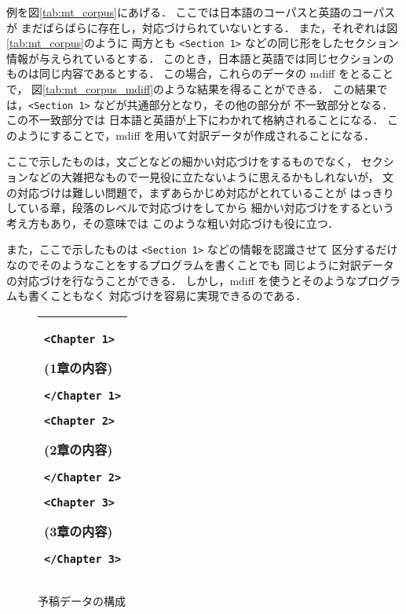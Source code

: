 例を図\ref{tab:mt_corpus}にあげる．
ここでは日本語のコーパスと英語のコーパスが
まだばらばらに存在し，対応づけられていないとする．
また，それぞれは図\ref{tab:mt_corpus}のように
両方とも \verb+<Section 1>+ などの同じ形をしたセクション情報が与えられているとする．
このとき，日本語と英語では同じセクションのものは同じ内容であるとする．
この場合，これらのデータの mdiff をとることで，
図\ref{tab:mt_corpus_mdiff}のような結果を得ることができる．
この結果では，\verb+<Section 1>+ などが共通部分となり，その他の部分が
不一致部分となる．この不一致部分では
日本語と英語が上下にわかれて格納されることになる．
このようにすることで，mdiff を用いて対訳データが作成されることになる．

ここで示したものは，文ごとなどの細かい対応づけをするものでなく，
セクションなどの大雑把なもので一見役に立たないように思えるかもしれないが，
文の対応づけは難しい問題で，まずあらかじめ対応がとれていることが
はっきりしている章，段落のレベルで対応づけをしてから
細かい対応づけをするという考え方もあり\cite{haruno_ipsj97}，その意味では
このような粗い対応づけも役に立つ．

また，ここで示したものは \verb+<Section 1>+ などの情報を認識させて
区分するだけなのでそのようなことをするプログラムを書くことでも
同じように対訳データの対応づけを行なうことができる．
しかし，mdiff を使うとそのようなプログラムも書くこともなく
対応づけを容易に実現できるのである．

\begin{figure}[t]
  \begin{center}
    \leavevmode

    \begin{tabular}[h]{|l|}\hline
{\begin{minipage}[h]{4cm}
\verb+<Chapter 1>+

(1章の内容)

\verb+</Chapter 1>+

\verb+<Chapter 2>+

(2章の内容)

\verb+</Chapter 2>+

\verb+<Chapter 3>+

(3章の内容)

\verb+</Chapter 3>+
\end{minipage}}\\\hline
\end{tabular}

\caption{予稿データの構成}
\label{tab:youkou_kousei}
\end{center}
\end{figure}

